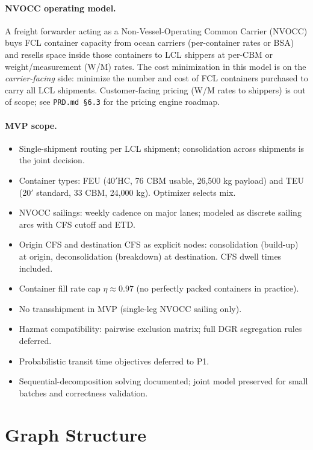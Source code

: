 \documentclass[11pt,a4paper]{article}
\theoremstyle{definition}
\begin{document}
\paragraph{NVOCC operating model.}
A freight forwarder acting as a Non-Vessel-Operating Common Carrier (NVOCC) buys FCL container
capacity from ocean carriers (per-container rates or BSA) and resells space inside those
containers to LCL shippers at per-CBM or weight/measurement (W/M) rates. The cost minimization
in this model is on the \emph{carrier-facing} side: minimize the number and cost of FCL
containers purchased to carry all LCL shipments. Customer-facing pricing (W/M rates to
shippers) is out of scope; see \texttt{PRD.md \S6.3} for the pricing engine roadmap.

\paragraph{MVP scope.}
\begin{itemize}[noitemsep]
  \item Single-shipment routing per LCL shipment; consolidation across shipments is the
        joint decision.
  \item Container types: FEU (40$'$HC, 76 CBM usable, 26,500 kg payload) and
        TEU (20$'$ standard, 33 CBM, 24,000 kg). Optimizer selects mix.
  \item NVOCC sailings: weekly cadence on major lanes; modeled as discrete sailing arcs
        with CFS cutoff and ETD.
  \item Origin CFS and destination CFS as explicit nodes: consolidation (build-up) at origin,
        deconsolidation (breakdown) at destination. CFS dwell times included.
  \item Container fill rate cap $\eta \approx 0.97$ (no perfectly packed containers in practice).
  \item No transshipment in MVP (single-leg NVOCC sailing only).
  \item Hazmat compatibility: pairwise exclusion matrix; full DGR segregation rules deferred.
  \item Probabilistic transit time objectives deferred to P1.
  \item Sequential-decomposition solving documented; joint model preserved for small batches
        and correctness validation.
\end{itemize}

\section{Graph Structure}
\end{document}
